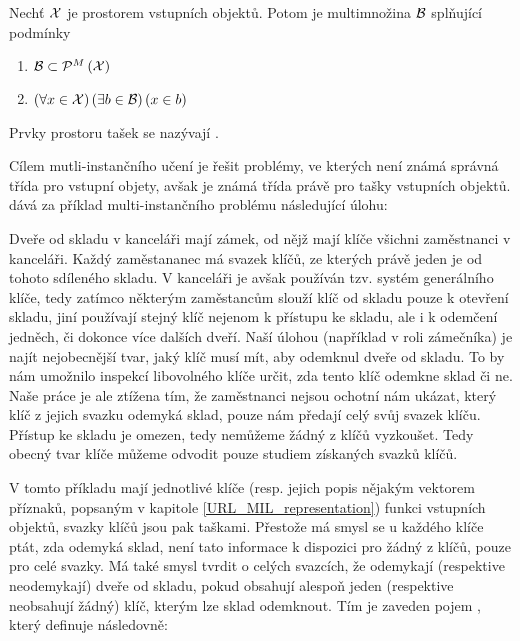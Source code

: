 \begin{define}
	Nechť \( \mathcal X \) je prostorem vstupních objektů. Potom  je multimnožina \( \mathcal B \) splňující podmínky
	\begin{enumerate}
		\item \( \mathcal B \subset \mathcal P^M \left( \mathcal X \right) \)
		\item \( \left( \forall x \in \mathcal X \right) \left( \exists b \in \mathcal B \right) \left( x \in b \right) \)
	\end{enumerate}
	Prvky prostoru tašek se nazývají .
\end{define}

Cílem mutli-instančního učení je řešit problémy, ve kterých není známá správná třída pro vstupní objety, avšak je známá třída právě pro tašky vstupních objektů. \cite{dietterich_solving_1997} dává za příklad multi-instančního problému následující úlohu:

\begin{example}
	Dveře od skladu v kanceláři mají zámek, od nějž mají klíče všichni zaměstnanci v kanceláři. Každý zaměstananec má svazek klíčů, ze kterých právě jeden je od tohoto sdíleného skladu. V kanceláři je avšak používán tzv. systém generálního klíče, tedy zatímco některým zaměstancům slouží klíč od skladu pouze k otevření skladu, jiní používají stejný klíč nejenom k přístupu ke skladu, ale i k odemčení jedněch, či dokonce více dalších dveří. Naší úlohou (například v roli zámečníka) je najít nejobecnější tvar, jaký klíč musí mít, aby odemknul dveře od skladu. To by nám umožnilo inspekcí libovolného klíče určit, zda tento klíč odemkne sklad či ne. Naše práce je ale ztížena tím, že zaměstnanci nejsou ochotní nám ukázat, který klíč z jejich svazku odemyká sklad, pouze nám předají celý svůj svazek klíču. Přístup ke skladu je omezen, tedy nemůžeme žádný z klíčů vyzkoušet. Tedy obecný tvar klíče můžeme odvodit pouze studiem získaných svazků klíčů.
\end{example}

V tomto příkladu mají jednotlivé klíče (resp. jejich popis nějakým vektorem příznaků, popsaným v kapitole \ref{URL_MIL_representation}) funkci vstupních objektů, svazky klíčů jsou pak taškami. Přestože má smysl se u každého klíče ptát, zda odemyká sklad, není tato informace k dispozici pro žádný z klíčů, pouze pro celé svazky. Má také smysl tvrdit o celých svazcích, že odemykají (respektive neodemykají) dveře od skladu, pokud obsahují alespoň jeden (respektive neobsahují žádný) klíč, kterým lze sklad odemknout. Tím je zaveden pojem , který \cite{dietterich_solving_1997} definuje následovně:

